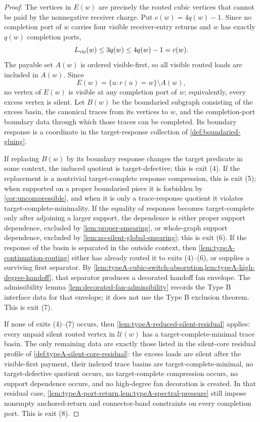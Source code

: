 \documentclass[11pt]{article}
\begin{document}
\begin{proof}
The vertices in $E(w)$ are precisely the routed cubic vertices that cannot be
paid by the nonnegative receiver charge.  Put $c(w)=4q(w)-1$.  Since no
completion port of $w$ carries four visible receiver-entry returns and $w$ has
exactly $q(w)$ completion ports,
\[
L_{\rm vis}(w)\le3q(w)\le4q(w)-1=c(w).
\]
The payable set $A(w)$ is ordered visible-first, so all visible routed loads are
included in \(A(w)\).  Since
\[
E(w)=\{u:r(u)=w\}\setminus A(w),
\]
no vertex of \(E(w)\) is visible at any completion port of \(w\);
equivalently, every excess vertex is silent.  Let $B(w)$ be the boundaried
subgraph consisting of the excess basin, the canonical traces from its vertices
to $w$, and the completion-port boundary data through which those traces can be
completed.  Its boundary response is a coordinate in the target-response
collection of \cref{def:boundaried-gluing}.

If replacing $B(w)$ by its boundary response changes the target predicate in
some context, the induced quotient is target-defective; this is exit (4).  If
the replacement is a nontrivial target-complete response compression, this is
exit (5); when supported on a proper boundaried piece it is forbidden by
\cref{cor:uncompressible}, and when it is only a trace-response quotient it
violates target-complete-minimality.  If the equality of responses becomes
target-complete only after adjoining a larger support, the dependence is either
proper support dependence, excluded by \cref{lem:proper-smearing}, or whole-graph
support dependence, excluded by \cref{lem:no-silent-global-smearing}; this is exit
(6).  If the response of the basin is separated in the outside context, then
\cref{lem:typeA-continuation-routing} either has already routed it to exits
(4)--(6), or supplies a surviving first separator.  By
\cref{lem:typeA-cubic-switch-absorption,lem:typeA-high-degree-handoff}, that
separator produces a decorated handoff fan envelope.  The admissibility lemma
\cref{lem:decorated-fan-admissibility} records the Type B interface data for
that envelope; it does not use the Type B exclusion theorem.  This is exit (7).

If none of exits (4)--(7) occurs, then
\cref{lem:typeA-reduced-silent-residual} applies: every unpaid silent routed
vertex in $\mathcal U(w)$ has a target-complete-minimal trace basin.  The only
remaining data are exactly those listed in the silent-core residual profile of
\cref{def:typeA-silent-core-residual}: the excess loads are silent after the
visible-first payment, their indexed trace basins are target-complete-minimal,
no target-defective quotient occurs, no target-complete compression occurs, no
support dependence occurs, and no high-degree fan decoration is created.  In that
residual case, \cref{lem:typeA-port-return,lem:typeA-spectral-pressure} still
impose nonempty anchored-return and connector-band constraints on every
completion port.  This is exit (8).
\end{proof}
\end{document}
